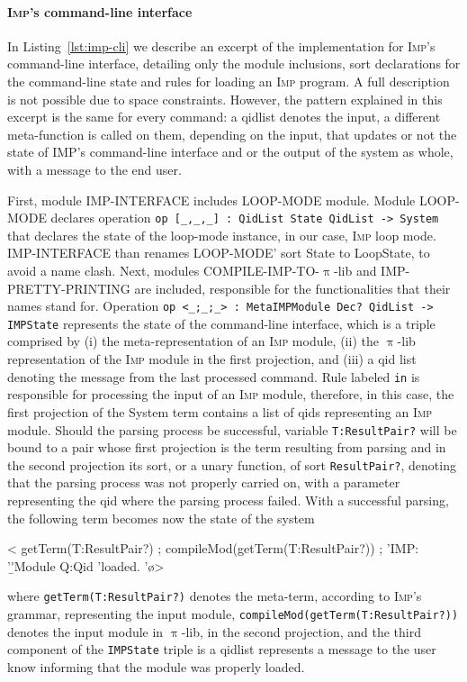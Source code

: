 \documentclass{llncs}%
\begin{document}




\paragraph{\textsc{Imp}'s command-line interface}

In Listing~\ref{lst:imp-cli} we describe an excerpt of the implementation for \textsc{Imp}'s command-line interface, detailing only the module inclusions, sort declarations for the command-line state and rules for loading an \textsc{Imp} program. A full description is not possible due to space constraints. However, the pattern explained in this excerpt is the same for every command: a qidlist denotes the input, a different meta-function is called on them, depending on the input, that updates or not the state of IMP's command-line interface and or the output of the system as whole, with a message to the end user.  

First, module IMP-INTERFACE includes LOOP-MODE module.
Module LOOP-MODE declares operation \texttt{op [\_,\_,\_] : QidList State QidList -> System} that declares the state of the loop-mode instance, in our case, \textsc{Imp} loop mode. IMP-INTERFACE than renames LOOP-MODE' sort State to LoopState, to avoid a name clash. Next, modules COMPILE-IMP-TO-$\uppi$-lib and IMP-PRETTY-PRINTING are included, responsible for the functionalities that their names stand for. 
Operation \texttt{op <\_;\_;\_> : MetaIMPModule Dec? QidList -> IMPState} represents the state of the command-line interface, which is a triple comprised by (i) the meta-representation of an \textsc{Imp} module, (ii) the $\uppi$-lib representation of the \textsc{Imp} module in the first projection, and (iii) a qid list denoting the message from the last processed command. Rule labeled \texttt{in} is responsible for processing the input of an \textsc{Imp} module, therefore, in this case, the first projection of the System term contains a list of qids representing an \textsc{Imp} module. Should the parsing process be successful, variable \texttt{T:ResultPair?} will be bound to a pair whose first projection is the term resulting from  parsing and in the second projection its sort, or a unary function, of sort \texttt{ResultPair?}, denoting that the parsing process was not properly carried on, with a parameter representing the qid where the parsing process failed. With a successful parsing, the following term becomes now the state of the system
\begin{maude}
< getTerm(T:ResultPair?) ; compileMod(getTerm(T:ResultPair?)) ; 
   'IMP: '\b 'Module Q:Qid 'loaded. '\o  >
\end{maude}
where \texttt{getTerm(T:ResultPair?)} denotes the meta-term, according to \textsc{Imp}'s grammar, representing the input module, \texttt{compileMod(getTerm(T:ResultPair?))} denotes the input module in $\uppi$-lib, in the second projection, and the third component of the \texttt{IMPState} triple is a qidlist represents a message to the user know informing that the module was properly loaded.
\end{document}
